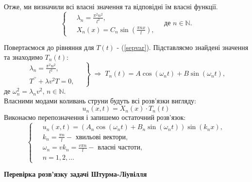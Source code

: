 \documentclass[a4paper, 14pt]{extreport}
\begin{document}
Отже, ми визначили всі власні значення та відповідні їм власні функції.
    \begin{equation} \label{ShLsol}
        \left\{ \begin{aligned}
            \;&\lambda_n = \frac{\pi^2 n^2}{l^2},\\ 
            &X_n(x) = C_n \sin\left(\frac{\pi n x}{l}\right),
        \end{aligned} \right.
        \quad \text{де } n \in \mathbb{N}.
    \end{equation}
    
Повертаємося до рівняння для $T(t)$ - (\ref{sepvar}). Підставляємо знайдені значення та знаходимо $T_n(t)$:
\begin{equation*}
    \left. \begin{aligned}
        \lambda_n = \frac{\pi^2 n^2}{l^2},&\;\\ 
        T^{\prime\prime} + \lambda v^2T = 0,&
    \end{aligned} \right\}
    \;\Rightarrow\;
    T_n(t) = A\cos(\omega_n t) + B\sin(\omega_n t),
\end{equation*}
де $\omega_n^2 = \lambda_n v^2, \, n \in \mathbb{N}.$\\
Власними модами коливань струни будуть всі розв'язки вигляду:
\begin{equation*}
    u_n(x,t) = X_n(x) \cdot T_n(t)
\end{equation*}
Виконаємо перепозначення і запишемо остаточний розв'язок:
\begin{equation}
    \left\{ \begin{aligned} \label{fullsol}
        \;&u_n(x,t) = \left(A_n\cos(\omega_n t) + B_n\sin(\omega_n t)\right) \sin(k_n x), \\
        &k_n = \frac{\pi n}{l} - \text{ хвильові вектори}, \\
        &\omega_n = vk_n = \frac{v \pi n}{l} - \text{ власні частоти}, \\
        &n = 1, 2,\ldots
    \end{aligned}\right.
\end{equation}

    \newpage
\begin{center}
    \large{\textbf{Перевірка розв'язку задачі Штурма-Ліувілля}}
\end{center}
\end{document}
